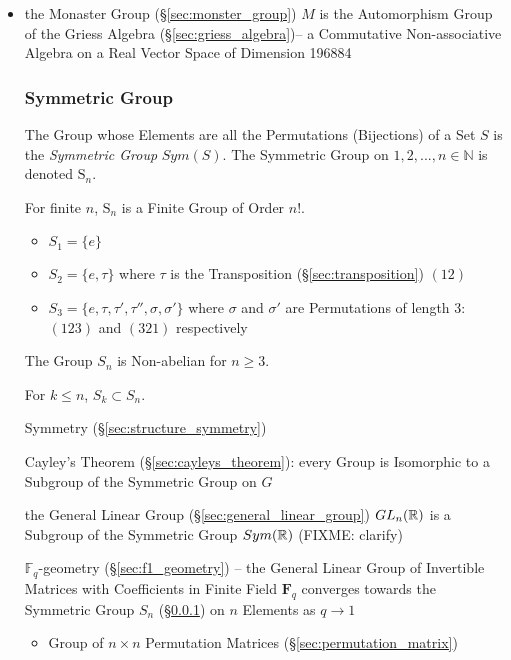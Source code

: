\begin{itemize}
\item the Monaster Group (\S\ref{sec:monster_group}) $M$ is the Automorphism
  Group of the Griess Algebra (\S\ref{sec:griess_algebra})-- a Commutative
  Non-associative Algebra on a Real Vector Space of Dimension 196884



\subsubsection{Symmetric Group}\label{sec:symmetric_group}

The Group whose Elements are all the Permutations (Bijections) of a
Set $S$ is the \emph{Symmetric Group} $Sym(S)$. The Symmetric Group on
${1, 2, ..., n} \in \mathbb{N}$ is denoted $\mathrm{S}_n$.

For finite $n$, $\mathrm{S}_n$ is a Finite Group of Order $n!$.

\begin{itemize}
    \item $S_1 = \{e\}$
    \item $S_2 = \{e,\tau\}$ where $\tau$ is the Transposition
      (\S\ref{sec:transposition}) $(12)$
    \item $S_3 = \{e, \tau, \tau', \tau'', \sigma, \sigma'\}$ where
      $\sigma$ and $\sigma'$ are Permutations of length 3: $(123)$ and
      $(321)$ respectively
\end{itemize}
The Group $S_n$ is Non-abelian for $n \geq 3$.

For $k \leq n$, $S_k \subset S_n$.

Symmetry (\S\ref{sec:structure_symmetry})

Cayley's Theorem (\S\ref{sec:cayleys_theorem}): every Group is
Isomorphic to a Subgroup of the Symmetric Group on $G$

\fist the General Linear Group (\S\ref{sec:general_linear_group})
$GL_n(\mathbb{R})$ is a Subgroup of the Symmetric Group $Sym(\mathbb{R})$ (FIXME:
clarify)

\fist $\mathbb{F}_q$-geometry (\S\ref{sec:f1_geometry}) -- the General Linear
Group of Invertible Matrices with Coefficients in Finite Field $\mathbf{F}_q$
converges towards the Symmetric Group $S_n$ (\S\ref{sec:symmetric_group}) on $n$
Elements as $q \rightarrow 1$

\begin{itemize}
  \item Group of $n \times n$ Permutation Matrices
    (\S\ref{sec:permutation_matrix})
\end{itemize}




\end{itemize}
